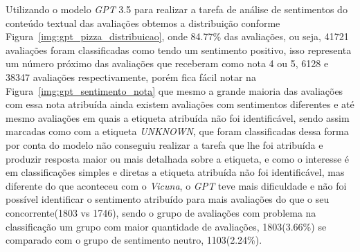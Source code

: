 Utilizando o modelo \textit{GPT} 3.5 para realizar a tarefa de análise de sentimentos do conteúdo textual das avaliações obtemos a distribuição conforme Figura~\ref{img:gpt_pizza_distribuicao}, onde 84.77\% das avaliações, ou seja, 41721 avaliações foram classificadas como tendo um sentimento positivo, isso representa um número próximo das avaliações que receberam como nota 4 ou 5, 6128 e 38347 avaliações respectivamente, porém fica fácil notar na Figura~\ref{img:gpt_sentimento_nota} que mesmo a grande maioria das avaliações com essa nota atribuída ainda existem avaliações com sentimentos diferentes e até mesmo avaliações em quais a etiqueta atribuída não foi identificável, sendo assim marcadas como com a etiqueta \textit{UNKNOWN}, que foram classificadas dessa forma por conta do modelo não conseguiu realizar a tarefa que lhe foi atribuída e produzir resposta maior ou mais detalhada sobre a etiqueta, e como o interesse é em classificações simples e diretas a etiqueta atribuída não foi identificável, mas diferente do que aconteceu com o \textit{Vicuna}, o \textit{GPT} teve mais dificuldade e não foi possível identificar o sentimento atribuído para mais avaliações do que o seu concorrente(1803 vs 1746), sendo o grupo de avaliações com problema na classificação um grupo com maior quantidade de avaliações, 1803(3.66\%) se comparado com o grupo de sentimento neutro, 1103(2.24\%).

